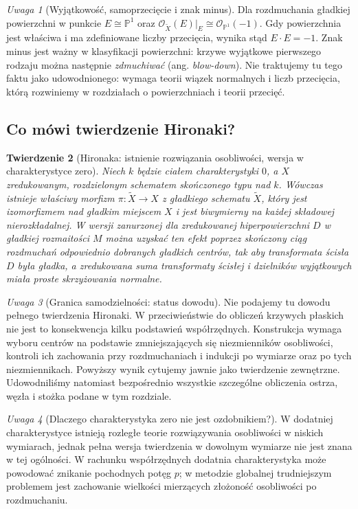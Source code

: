 \documentclass[11pt,a4paper,openany]{report}
\numberwithin{equation}{section}
\theoremstyle{plain}
\newtheorem{twierdzenie}{Twierdzenie}[section]
\theoremstyle{definition}
\theoremstyle{remark}
\newtheorem{uwaga}[twierdzenie]{Uwaga}
\newcommand{\PP}{\mathbb P}
\begin{document}
\begin{uwaga}[Wyjątkowość, samoprzecięcie i znak minus]
Dla rozdmuchania gładkiej powierzchni w punkcie
$E\cong\PP^1$ oraz
$\mathcal O_{\widetilde X}(E)|_E\cong\mathcal O_{\PP^1}(-1)$.
Gdy powierzchnia jest właściwa i ma zdefiniowane
liczby przecięcia, wynika stąd $E\cdot E=-1$.
Znak minus jest ważny w klasyfikacji powierzchni:
krzywe wyjątkowe pierwszego rodzaju można następnie
\emph{zdmuchiwać} (ang. \emph{blow-down}).
Nie traktujemy tu tego faktu jako udowodnionego:
wymaga teorii wiązek normalnych i liczb przecięcia,
którą rozwiniemy w rozdziałach o powierzchniach
i teorii przecięć.
\end{uwaga}

\subsection{Co mówi twierdzenie Hironaki?}

\begin{twierdzenie}[Hironaka: istnienie rozwiązania osobliwości,
wersja w charakterystyce zero]
\label{tw:ga5-hironaka}
Niech $k$ będzie ciałem charakterystyki $0$, a $X$
zredukowanym, rozdzielonym schematem skończonego typu nad $k$.
Wówczas istnieje właściwy morfizm
$\pi:\widetilde X\to X$ z gładkiego schematu
$\widetilde X$, który jest izomorfizmem nad gładkim
miejscem $X$ i jest biwymierny na każdej składowej
nierozkładalnej. W wersji zanurzonej dla zredukowanej
hiperpowierzchni $D$ w gładkiej rozmaitości $M$
można uzyskać ten efekt poprzez skończony ciąg
rozdmuchań odpowiednio dobranych gładkich centrów,
tak aby transformata ścisła $D$ była gładka, a
zredukowana suma transformaty ścisłej i dzielników
wyjątkowych miała proste skrzyżowania normalne.
\end{twierdzenie}

\begin{uwaga}[Granica samodzielności: status dowodu]
Nie podajemy tu dowodu pełnego twierdzenia Hironaki.
W przeciwieństwie do obliczeń krzywych płaskich nie jest
to konsekwencja kilku podstawień współrzędnych.
Konstrukcja wymaga wyboru centrów na podstawie
zmniejszających się niezmienników osobliwości,
kontroli ich zachowania przy rozdmuchaniach
i indukcji po wymiarze oraz po tych niezmiennikach.
Powyższy wynik cytujemy jawnie jako twierdzenie
zewnętrzne. Udowodniliśmy natomiast bezpośrednio
wszystkie szczególne obliczenia ostrza, węzła
i stożka podane w tym rozdziale.
\end{uwaga}

\begin{uwaga}[Dlaczego charakterystyka zero nie jest ozdobnikiem?]
W dodatniej charakterystyce istnieją rozległe
teorie rozwiązywania osobliwości w niskich wymiarach,
jednak pełna wersja twierdzenia w dowolnym wymiarze
nie jest znana w tej ogólności. W rachunku
współrzędnych dodatnia charakterystyka może powodować
znikanie pochodnych potęg $p$; w metodzie globalnej
trudniejszym problemem jest zachowanie wielkości
mierzących złożoność osobliwości po rozdmuchaniu.
\end{uwaga}
\end{document}
